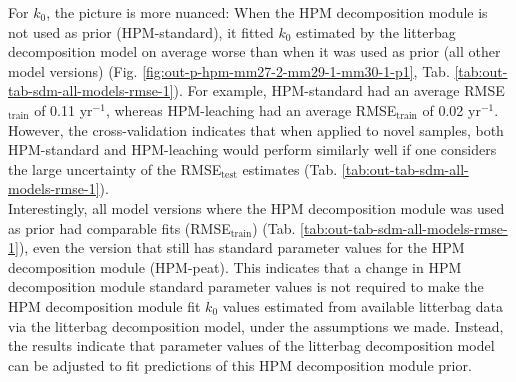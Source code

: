\documentclass[esd, manuscript]{copernicus}
\begin{document}
For \(k_0\), the picture is more nuanced: When the HPM decomposition module is not used as prior (HPM-standard), it fitted \(k_0\) estimated by the litterbag decomposition model on average worse than when it was used as prior (all other model versions) (Fig. \ref{fig:out-p-hpm-mm27-2-mm29-1-mm30-1-p1}, Tab. \ref{tab:out-tab-sdm-all-models-rmse-1}). For example,
HPM-standard had an average RMSE\(_\text{train}\) of 0.11 yr\(^{-1}\), whereas HPM-leaching had an average RMSE\(_\text{train}\) of 0.02 yr\(^{-1}\). However, the cross-validation indicates that when applied to novel samples, both HPM-standard and HPM-leaching would perform similarly well if one considers the large uncertainty of the RMSE\(_\text{test}\) estimates (Tab. \ref{tab:out-tab-sdm-all-models-rmse-1}).\\
Interestingly, all model versions where the HPM decomposition module was used as prior had comparable fits (RMSE\(_\text{train}\)) (Tab. \ref{tab:out-tab-sdm-all-models-rmse-1}), even the version that still has standard parameter values for the HPM decomposition module (HPM-peat). This indicates that a change in HPM decomposition module standard parameter values is not required to make the HPM decomposition module fit \(k_0\) values estimated from available litterbag data via the litterbag decomposition model, under the assumptions we made. Instead, the results indicate that parameter values of the litterbag decomposition model can be adjusted to fit predictions of this HPM decomposition module prior.
\end{document}
